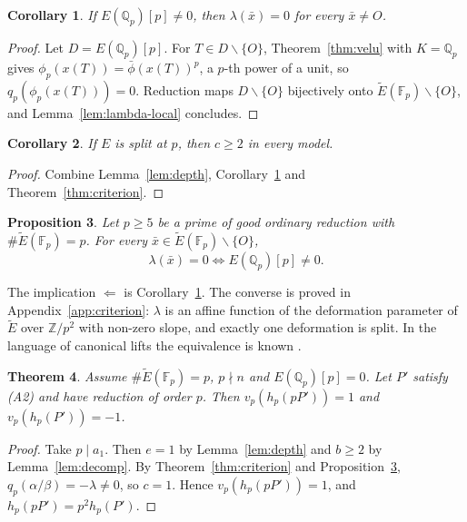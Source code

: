 \documentclass[11pt,a4paper]{amsart}
\newcommand{\Z}{\mathbb{Z}}
\newcommand{\Qp}{\mathbb{Q}_p}
\newcommand{\Fp}{\mathbb{F}_p}
\newcommand{\Et}{\widetilde{E}}
\newcommand{\qp}{q_p}
\theoremstyle{plain}
\newtheorem{theorem}{Theorem}[section]
\newtheorem{proposition}[theorem]{Proposition}
\newtheorem{corollary}[theorem]{Corollary}
\theoremstyle{definition}
\theoremstyle{remark}
\begin{document}
\begin{corollary}\label{cor:split-lambda}
If $E(\Qp)[p]\ne0$, then $\lambda(\bar x)=0$ for every $\bar x\ne O$.
\end{corollary}

\begin{proof}
Let $D=E(\Qp)[p]$. For $T\in D\smallsetminus\{O\}$, Theorem~\ref{thm:velu} with $K=\Qp$ gives $\phi_p(x(T))=\bar\phi(x(T))^p$, a $p$-th power of a unit, so $\qp(\phi_p(x(T)))=0$. Reduction maps $D\smallsetminus\{O\}$ bijectively onto $\Et(\Fp)\smallsetminus\{O\}$, and Lemma~\ref{lem:lambda-local} concludes.
\end{proof}

\begin{corollary}\label{cor:split-c}
If $E$ is split at $p$, then $c\ge2$ in every model.
\end{corollary}

\begin{proof}
Combine Lemma~\ref{lem:depth}, Corollary~\ref{cor:split-lambda} and Theorem~\ref{thm:criterion}.
\end{proof}

\begin{proposition}\label{prop:criterion}
Let $p\ge5$ be a prime of good ordinary reduction with $\#\Et(\Fp)=p$. For every $\bar x\in\Et(\Fp)\smallsetminus\{O\}$,
\[
\lambda(\bar x)=0\iff E(\Qp)[p]\ne0 .
\]
\end{proposition}

The implication $\Leftarrow$ is Corollary~\ref{cor:split-lambda}. The converse is proved in Appendix~\ref{app:criterion}: $\lambda$ is an affine function of the deformation parameter of $\Et$ over $\Z/p^2$ with non-zero slope, and exactly one deformation is split. In the language of canonical lifts the equivalence is known \cite{Gro90,LR,DW,OY}.

\begin{theorem}\label{thm:nonsplit}
Assume $\#\Et(\Fp)=p$, $p\nmid n$ and $E(\Qp)[p]=0$. Let $P'$ satisfy \textup{(A2)} and have reduction of order $p$. Then $v_p(h_p(pP'))=1$ and $v_p(h_p(P'))=-1$.
\end{theorem}

\begin{proof}
Take $p\mid a_1$. Then $e=1$ by Lemma~\ref{lem:depth} and $b\ge2$ by Lemma~\ref{lem:decomp}. By Theorem~\ref{thm:criterion} and Proposition~\ref{prop:criterion}, $\qp(\alpha/\beta)=-\lambda\ne0$, so $c=1$. Hence $v_p(h_p(pP'))=1$, and $h_p(pP')=p^2h_p(P')$.
\end{proof}
\end{document}
